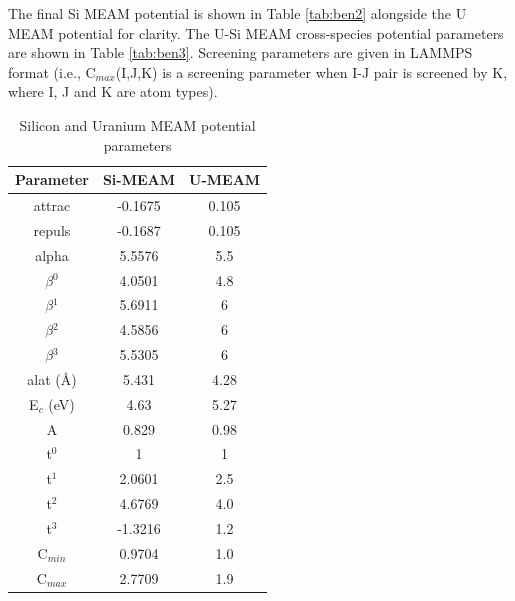 \documentclass[review]{elsarticle}
\begin{document}
The final Si MEAM potential is shown in Table \ref{tab:ben2} alongside the U MEAM potential for clarity.  The U-Si MEAM cross-species potential parameters are shown in Table \ref{tab:ben3}.  Screening parameters are given in LAMMPS format (i.e., C$_{max}$(I,J,K) is a screening parameter when I-J pair is screened by K, where I, J and K are atom types).  

\begin{table}[h]
\caption{Silicon and Uranium MEAM potential parameters}\label{tab:ben2}
\begin{center}
\begin{tabular}{|c|c|c|}
     \hline
     Parameter & Si-MEAM  & U-MEAM  \\
     \hline
     attrac & -0.1675 & 0.105  \\
     repuls & -0.1687 & 0.105 \\
     alpha & 5.5576 & 5.5   \\
     $\beta$$^{0}$ & 4.0501 & 4.8  \\
     $\beta$$^{1}$ & 5.6911 & 6  \\
     $\beta$$^{2}$ & 4.5856 & 6 \\  
     $\beta$$^{3}$ & 5.5305 & 6  \\
     alat (\AA) & 5.431 & 4.28  \\
     E$_{c}$ (eV) & 4.63 & 5.27 \\
     A & 0.829 & 0.98 \\
     t$^{0}$ & 1 & 1 \\
     t$^{1}$ & 2.0601 & 2.5  \\
     t$^{2}$ & 4.6769 & 4.0 \\
     t$^{3}$ & -1.3216 & 1.2  \\
     C$_{min}$ & 0.9704 & 1.0 \\ 
     C$_{max}$ & 2.7709 & 1.9  \\
     \hline
\end{tabular}
\end{center}
\label{default}
\end{table}%
\end{document}
